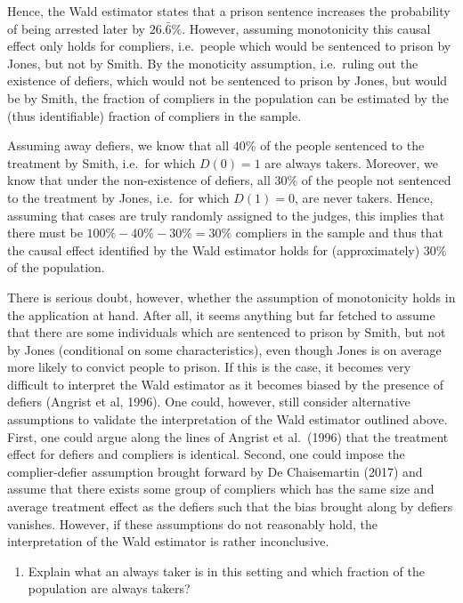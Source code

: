 \documentclass[
]{article}
\providecommand{\tightlist}{%
  \setlength{\itemsep}{0pt}\setlength{\parskip}{0pt}}
\begin{document}
Hence, the Wald estimator states that a prison sentence increases the
probability of being arrested later by \(26.\bar{6}\%\). However,
assuming monotonicity this causal effect only holds for compliers,
i.e.~people which would be sentenced to prison by Jones, but not by
Smith. By the monoticity assumption, i.e.~ruling out the existence of
defiers, which would not be sentenced to prison by Jones, but would be
by Smith, the fraction of compliers in the population can be estimated
by the (thus identifiable) fraction of compliers in the sample.

Assuming away defiers, we know that all \(40\%\) of the people sentenced
to the treatment by Smith, i.e.~for which \(D(0)=1\) are always takers.
Moreover, we know that under the non-existence of defiers, all \(30\%\)
of the people not sentenced to the treatment by Jones, i.e.~for which
\(D(1)=0\), are never takers. Hence, assuming that cases are truly
randomly assigned to the judges, this implies that there must be
\(100\%-40\%-30\%=30\%\) compliers in the sample and thus that the
causal effect identified by the Wald estimator holds for (approximately)
\(30\%\) of the population.

There is serious doubt, however, whether the assumption of monotonicity
holds in the application at hand. After all, it seems anything but far
fetched to assume that there are some individuals which are sentenced to
prison by Smith, but not by Jones (conditional on some characteristics),
even though Jones is on average more likely to convict people to prison.
If this is the case, it becomes very difficult to interpret the Wald
estimator as it becomes biased by the presence of defiers (Angrist et
al, 1996). One could, however, still consider alternative assumptions to
validate the interpretation of the Wald estimator outlined above. First,
one could argue along the lines of Angrist et al.~(1996) that the
treatment effect for defiers and compliers is identical. Second, one
could impose the complier-defier assumption brought forward by De
Chaisemartin (2017) and assume that there exists some group of compliers
which has the same size and average treatment effect as the defiers such
that the bias brought along by defiers vanishes. However, if these
assumptions do not reasonably hold, the interpretation of the Wald
estimator is rather inconclusive.

\begin{enumerate}
\def\labelenumi{\alph{enumi})}
\setcounter{enumi}{2}
\tightlist
\item
  Explain what an always taker is in this setting and which fraction of
  the population are always takers?
\end{enumerate}
\end{document}
